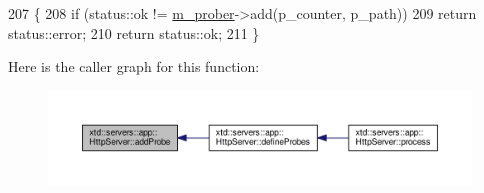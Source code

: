 \begin{DoxyCode}
207 \{
208   \textcolor{keywordflow}{if} (status::ok != \hyperlink{classxtd_1_1servers_1_1app_1_1HttpServer_aa26ddc958ab07774e8ba45e89dc0011b}{m\_prober}->add(p\_counter, p\_path))
209     \textcolor{keywordflow}{return} status::error;
210   \textcolor{keywordflow}{return} status::ok;
211 \}
\end{DoxyCode}


Here is the caller graph for this function\-:
\nopagebreak
\begin{figure}[H]
\begin{center}
\leavevmode
\includegraphics[width=350pt]{classxtd_1_1servers_1_1app_1_1HttpServer_a0ff20a40a0e31dbb1e82be87be0e255f_icgraph}
\end{center}
\end{figure}


